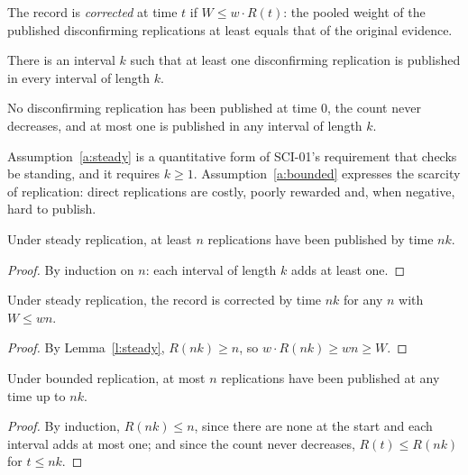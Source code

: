 \documentclass{situationist-preprint}
\begin{document}
\begin{definition}[Correction]\label{d:corr}
The record is \emph{corrected} at time $t$ if $W \le w\cdot R(t)$: the pooled weight of the published disconfirming replications at least equals that of the original evidence.
\end{definition}

\begin{assumption}\label{a:steady}
There is an interval $k$ such that at least one disconfirming replication is published in every interval of length $k$.
\end{assumption}

\begin{assumption}\label{a:bounded}
No disconfirming replication has been published at time $0$, the count never decreases, and at most one is published in any interval of length $k$.
\end{assumption}

Assumption~\ref{a:steady} is a quantitative form of SCI-01's requirement that checks be standing, and it requires $k \ge 1$. Assumption~\ref{a:bounded} expresses the scarcity of replication: direct replications are costly, poorly rewarded and, when negative, hard to publish.

\begin{lemma}\label{l:steady}
Under steady replication, at least $n$ replications have been published by time $nk$.
\end{lemma}

\begin{proof}
By induction on $n$: each interval of length $k$ adds at least one.
\end{proof}

\begin{theorem}\label{t:eventual}
Under steady replication, the record is corrected by time $nk$ for any $n$ with $W \le w n$.
\end{theorem}

\begin{proof}
By Lemma~\ref{l:steady}, $R(nk) \ge n$, so $w\cdot R(nk) \ge wn \ge W$.
\end{proof}

\begin{lemma}\label{l:bounded}
Under bounded replication, at most $n$ replications have been published at any time up to $nk$.
\end{lemma}

\begin{proof}
By induction, $R(nk) \le n$, since there are none at the start and each interval adds at most one; and since the count never decreases, $R(t) \le R(nk)$ for $t \le nk$.
\end{proof}
\end{document}
